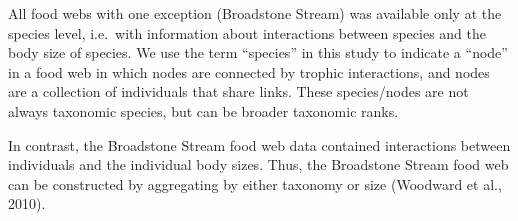 \documentclass{article}
\begin{document}
All food webs with one exception (Broadstone Stream) was available only
at the species level, i.e.~with information about interactions between
species and the body size of species. We use the term ``species'' in
this study to indicate a ``node'' in a food web in which nodes are
connected by trophic interactions, and nodes are a collection of
individuals that share links. These species/nodes are not always
taxonomic species, but can be broader taxonomic ranks.

In contrast, the Broadstone Stream food web data contained interactions
between individuals and the individual body sizes. Thus, the Broadstone
Stream food web can be constructed by aggregating by either taxonomy or
size (Woodward et al., 2010).

\begin{landscape}\begin{table}


\end{table}
\end{landscape}
\end{document}
